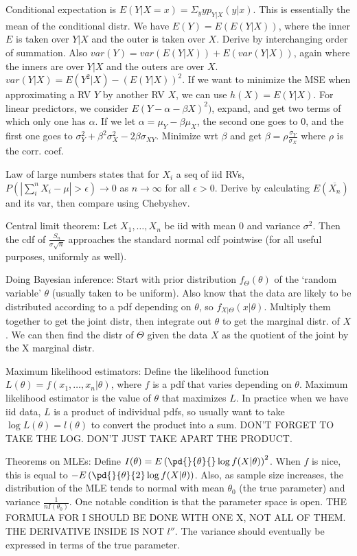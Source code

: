 \documentclass{article}
\newcommand{\conj}{\overline}
\begin{document}
Conditional expectation is $E(Y|X=x)=\Sigma_yyp_{Y|X}(y|x)$. This is essentially the mean of the conditional distr. We have $E(Y)=E(E(Y|X))$, where the inner $E$ is taken over $Y|X$ and the outer is taken over $X$. Derive by interchanging order of summation. Also $var(Y)=var(E(Y|X))+E(var(Y|X))$, again where the inners are over $Y|X$ and the outers are over $X$. $var(Y|X)=E(Y^2|X)-(E(Y|X))^2$. 
If we want to minimize the MSE when approximating a RV $Y$ by another RV $X$, we can use $h(X)=E(Y|X)$. For linear predictors, we consider $E(Y-\alpha-\beta X)^2)$, expand, and get two terms of which only one has $\alpha$. If we let $\alpha=\mu_Y-\beta\mu_X$, the second one goes to $0$, and the first one goes to $\sigma_Y^2+\beta^2\sigma_X^2-2\beta\sigma_{XY}$. Minimize wrt $\beta$ and get $\beta=\rho\frac{\sigma_Y}{\sigma_X}$ where $\rho$ is the corr. coef.

Law of large numbers states that for $X_i$ a seq of iid RVs, $P(|\sum_i^nX_i-\mu|>\epsilon)\to0$ as $n\to\infty$ for all $\epsilon>0$. Derive by calculating $E(\conj{X_n})$ and its var, then compare using Chebyshev.

Central limit theorem: Let $X_1,\ldots,X_n$ be iid with mean $0$ and variance $\sigma^2$. Then the cdf of $\frac{S_n}{\sigma\sqrt{n}}$ approaches the standard normal cdf pointwise (for all useful purposes, uniformly as well).

Doing Bayesian inference: Start with prior distribution $f_\Theta(\theta)$ of the `random variable' $\theta$ (usually taken to be uniform). Also know that the data are likely to be distributed according to a pdf depending on $\theta$, so $f_{X|\Theta}(x|\theta)$. Multiply them together to get the joint distr, then integrate out $\theta$ to get the marginal distr. of $X$. We can then find the distr of $\Theta$ given the data $X$ as the quotient of the joint by the X marginal distr.

Maximum likelihood estimators: Define the likelihood function $L(\theta)=f(x_1,\ldots,x_n|\theta)$, where $f$ is a pdf that varies depending on $\theta$. Maximum likelihood estimator is the value of $\theta$ that maximizes $L$. In practice when we have iid data, $L$ is a product of individual pdfs, so usually want to take $\log L(\theta)=l(\theta)$ to convert the product into a sum. DON'T FORGET TO TAKE THE LOG. DON'T JUST TAKE APART THE PRODUCT. 

Theorems on MLEs: Define $I(\theta)=E\left(\pd{}{\theta}{}\log f(X|\theta)\right)^2$. When $f$ is nice, this is equal to $-E\left(\pd{}{\theta}{2}\log f(X|\theta)\right)$. Also, as sample size increases, the distribution of the MLE tends to normal with mean $\theta_0$ (the true parameter) and variance $\frac{1}{nI(\theta_0)}$. One notable condition is that the parameter space is open. THE FORMULA FOR I SHOULD BE DONE WITH ONE X, NOT ALL OF THEM. THE DERIVATIVE INSIDE IS NOT $l''$. The variance should eventually be expressed in terms of the true parameter.
\end{document}
